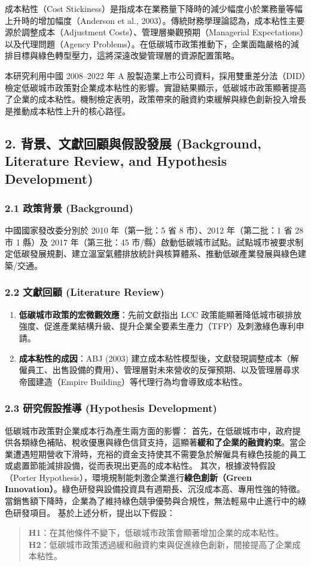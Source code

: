 \documentclass[11pt,a4paper]{article}
\begin{document}
成本粘性（Cost Stickiness）是指成本在業務量下降時的減少幅度小於業務量等幅上升時的增加幅度（Anderson et al., 2003）。傳統財務學理論認為，成本粘性主要源於調整成本（Adjustment Costs）、管理層樂觀預期（Managerial Expectations）以及代理問題（Agency Problems）。在低碳城市政策推動下，企業面臨嚴格的減排目標與綠色轉型壓力，這將深遠改變管理層的資源配置策略。

本研究利用中國 2008--2022 年 A 股製造業上市公司資料，採用雙重差分法（DID）檢定低碳城市政策對企業成本粘性的影響。實證結果顯示，低碳城市政策顯著提高了企業的成本粘性。機制檢定表明，政策帶來的融資約束緩解與綠色創新投入增長是推動成本粘性上升的核心路徑。

\subsection{2. 背景、文獻回顧與假設發展 (Background, Literature Review, and Hypothesis Development)}

\subsubsection{2.1 政策背景 (Background)}
中國國家發改委分別於 2010 年（第一批：5 省 8 市）、2012 年（第二批：1 省 28 市 1 縣）及 2017 年（第三批：45 市/縣）啟動低碳城市試點。試點城市被要求制定低碳發展規劃、建立溫室氣體排放統計與核算體系、推動低碳產業發展與綠色建築/交通。

\subsubsection{2.2 文獻回顧 (Literature Review)}
\begin{enumerate}
    \item \textbf{低碳城市政策的宏微觀效應}：先前文獻指出 LCC 政策能顯著降低城市碳排放強度、促進產業結構升級、提升企業全要素生產力（TFP）及刺激綠色專利申請。
    \item \textbf{成本粘性的成因}：ABJ (2003) 建立成本粘性模型後，文獻發現調整成本（解僱員工、出售設備的費用）、管理層對未來營收的反彈預期、以及管理層尋求帝國建造（Empire Building）等代理行為均會導致成本粘性。
\end{enumerate}

\subsubsection{2.3 研究假設推導 (Hypothesis Development)}
低碳城市政策對企業成本行為產生兩方面的影響：
首先，在低碳城市中，政府提供各類綠色補貼、稅收優惠與綠色信貸支持，這顯著\textbf{緩和了企業的融資約束}。當企業遭遇短期營收下滑時，充裕的資金支持使其不需要急於解僱具有綠色技能的員工或處置節能減排設備，從而表現出更高的成本粘性。
其次，根據波特假設（Porter Hypothesis），環境規制能刺激企業進行\textbf{綠色創新（Green Innovation）}。綠色研發與設備投資具有週期長、沉沒成本高、專用性強的特徵。當銷售額下降時，企業為了維持綠色競爭優勢與合規性，無法輕易中止進行中的綠色研發項目。
基於上述分析，提出以下假設：
\begin{quote}
\textbf{H1}：在其他條件不變下，低碳城市政策會顯著增加企業的成本粘性。\\
\textbf{H2}：低碳城市政策透過緩和融資約束與促進綠色創新，間接提高了企業成本粘性。
\end{quote}
\end{document}
